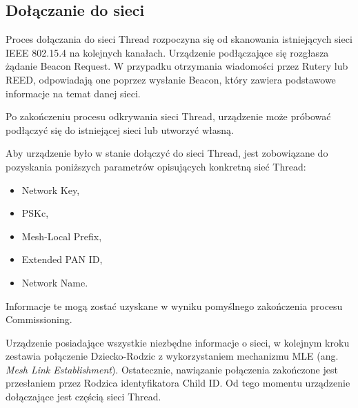     \subsection{Dołączanie do sieci}

    Proces dołączania do sieci Thread rozpoczyna się od skanowania istniejących sieci IEEE 802.15.4 na kolejnych kanałach. Urządzenie podłączające się rozgłasza żądanie Beacon Request. W przypadku otrzymania wiadomości przez Rutery lub REED, odpowiadają one poprzez wysłanie Beacon, który zawiera podstawowe informacje na temat danej sieci.

    Po zakończeniu procesu odkrywania sieci Thread, urządzenie może próbować podłączyć się do istniejącej sieci lub utworzyć własną.

    Aby urządzenie było w stanie dołączyć do sieci Thread, jest zobowiązane do pozyskania poniższych parametrów opisujących konkretną sieć Thread:
    \begin{itemize}
        \item Network Key,
        \item PSKc,
        \item Mesh-Local Prefix,
        \item Extended PAN ID,
        \item Network Name.
    \end{itemize}
    
    Informacje te mogą zostać uzyskane w wyniku pomyślnego zakończenia procesu Commissioning.

    Urządzenie posiadające wszystkie niezbędne informacje o sieci, w kolejnym kroku zestawia połączenie Dziecko-Rodzic z wykorzystaniem mechanizmu MLE (ang. \textit{Mesh Link Establishment}). Ostatecznie, nawiązanie połączenia zakończone jest przesłaniem przez Rodzica identyfikatora Child ID. Od tego momentu urządzenie dołączające jest częścią sieci Thread.

















